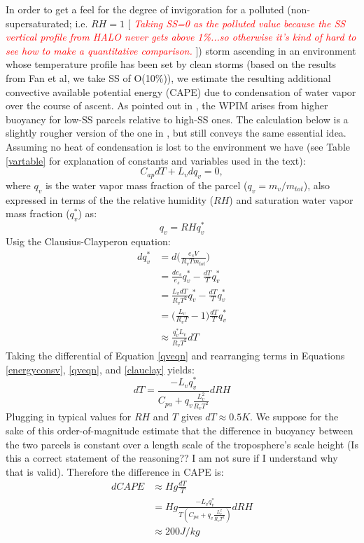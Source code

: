 \documentclass{article}
\newcommand{\klcomm}[1]{\textcolor{red}{\textit{#1}}}
\begin{document}
In order to get a feel for the degree of invigoration for a polluted (non-supersaturated; i.e. $RH=1$ [ \klcomm{Taking SS=0 as the polluted value because the SS vertical profile from HALO never gets above 1\%...so otherwise it's kind of hard to see how to make a quantitative comparison.} ]) storm ascending in an environment whose temperature profile has been set by clean storms (based on the results from Fan et al, we take SS of O(10\%)), we estimate the resulting additional convective available potential energy (CAPE) due to condensation of water vapor over the course of ascent. As pointed out in \cite{Grabowski2020}, the WPIM arises from higher buoyancy for low-SS parcels relative to high-SS ones. The calculation below is a slightly rougher version of the one in \cite{Grabowski2015}, but still conveys the same essential idea. Assuming no heat of condensation is lost to the environment we have (see Table \ref{vartable} for explanation of constants and variables used in the text):
\begin{equation}
\label{energyconsv}
C_{ap}dT + L_vdq_v = 0,
\end{equation}
where $q_v$ is the water vapor mass fraction of the parcel ($q_v=m_v/m_{tot}$), also expressed in terms of the the relative humidity ($RH$) and saturation water vapor mass fraction ($q_v^*$) as:
\begin{equation}
\label{qveqn}
q_v = RHq_v^*
\end{equation}
Usig the Clausius-Clayperon equation:
\begin{align}
\label{clauclay}
dq_v^* &= d\Big(\frac{e_sV}{R_vTm_{tot}}\Big)\nonumber\\
&=\frac{de_s}{e_s}q_v^* - \frac{dT}{T}q_v^*\nonumber\\
&=\frac{L_vdT}{R_vT^2}q_v^* - \frac{dT}{T}q_v^*\nonumber\\
&=\Big(\frac{L_v}{R_vT} - 1\Big)\frac{dT}{T}q_v^*\nonumber\\
&\approx \frac{q_v^*L_v}{R_vT^2}dT
\end{align}
Taking the differential of Equation \ref{qveqn} and rearranging terms in Equations \ref{energyconsv}, \ref{qveqn}, and \ref{clauclay} yields:
\begin{equation}
dT = \frac{-L_vq_v^*}{C_{pa} + q_v\frac{L_v^2}{R_vT^2}}dRH
\end{equation}
Plugging in typical values for $RH$ and $T$ gives $dT\approx 0.5K$. We suppose for the sake of this order-of-magnitude estimate that the difference in buoyancy between the two parcels is constant over a length scale of the troposphere's scale height (Is this a correct statement of the reasoning?? I am not sure if I understand why that is valid). Therefore the difference in CAPE is:
\begin{align}
dCAPE &\approx Hg \frac{dT}{T}\nonumber\\
&=Hg\frac{-L_vq_v^*}{T(C_{pa} + q_v\frac{L_v^2}{R_vT^2})}dRH\nonumber\\
&\approx 200 J/kg
\end{align}
\end{document}
